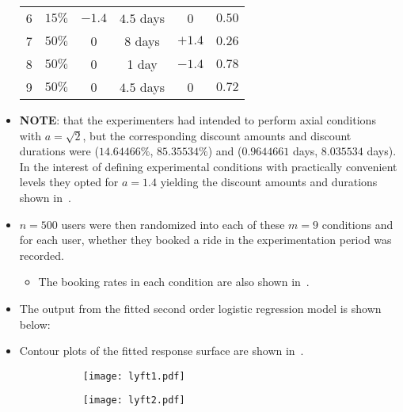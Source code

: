 \begin{itemize}
\begin{table}[!htbp]
\begin{tabular}{cccccc}
                  6                  & $15 \%$         & $-1.4$  & $4.5$ days        & 0       & $0.50$       \\
                  7                  & $50 \%$         & 0       & 8 days            & $+1.4$  & $0.26$       \\
                  8                  & $50 \%$         & 0       & 1 day             & $-1.4$  & $0.78$       \\
                  9                  & $50 \%$         & 0       & $4.5$ days        & 0       & $0.72$       \\
                  \bottomrule
              \end{tabular}
          \end{table}
    \item \textbf{NOTE}: that the experimenters had intended to perform axial conditions with $ a=\sqrt{2} $, but the
          corresponding discount amounts and discount durations were ($14.64466\%$, $85.35534\%$) and ($0.9644661$ days, $8.035534$ days). In the interest of defining experimental conditions with practically convenient
          levels they opted for $ a = 1.4 $ yielding the discount amounts and durations shown in~.
    \item $ n = 500 $ users were then randomized into each of these $ m = 9 $ conditions and for each user, whether
          they booked a ride in the experimentation period was recorded.
          \begin{itemize}
              \item The booking rates in each condition are also shown in~.
          \end{itemize}
    \item The output from the fitted second order logistic regression model is shown below:
          
    \item Contour plots of the fitted response surface are shown in~.
          \begin{figure}[!htbp]
              \centering
              \begin{subfigure}{0.48\textwidth}
                  \centering
                  \texttt{[image: lyft1.pdf]}\caption{}\label{subfig:Lyft1}
              \end{subfigure}
              \begin{subfigure}{0.48\textwidth}
                  \centering
                  \texttt{[image: lyft2.pdf]}\caption{}\label{subfig:Lyft2}

\end{subfigure}
\end{figure}
\end{itemize}
